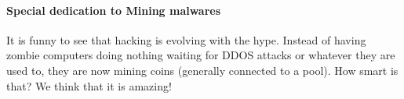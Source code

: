 \paragraph{Special dedication to Mining malwares}
It is funny to see that hacking is evolving with the hype. Instead of having zombie computers doing nothing waiting for DDOS attacks or whatever they are used to, they are now mining coins (generally connected to a pool). How smart is that? We think that it is amazing!



